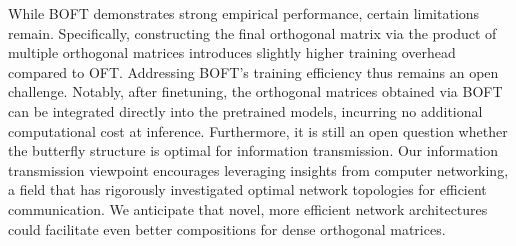 While BOFT demonstrates strong empirical performance, certain limitations remain. Specifically, constructing the final orthogonal matrix via the product of multiple orthogonal matrices introduces slightly higher training overhead compared to OFT. Addressing BOFT's training efficiency thus remains an open challenge. Notably, after finetuning, the orthogonal matrices obtained via BOFT can be integrated directly into the pretrained models, incurring no additional computational cost at inference. Furthermore, it is still an open question whether the butterfly structure is optimal for information transmission. Our information transmission viewpoint encourages leveraging insights from computer networking, a field that has rigorously investigated optimal network topologies for efficient communication. We anticipate that novel, more efficient network architectures could facilitate even better compositions for dense orthogonal matrices.